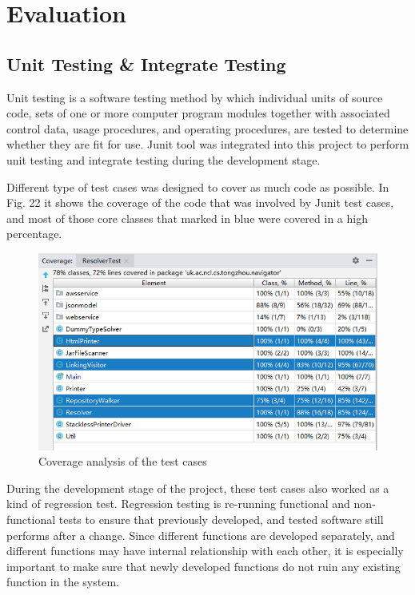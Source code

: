 \documentclass[runningheads]{llncs}
\begin{document}
\section{Evaluation}

\subsection{Unit Testing \& Integrate Testing}

Unit testing is a software testing method by which individual units of source code, sets of one or more computer program modules together with associated control data, usage procedures, and operating procedures, are tested to determine whether they are fit for use.\cite{huizinga2007automated} Junit tool was integrated into this project to perform unit testing and integrate testing during the development stage.

Different type of test cases was designed to cover as much code as possible. In Fig. 22 it shows the coverage of the code that was involved by Junit test cases, and most of those core classes that marked in blue were covered in a high percentage.

\begin{figure}[H]
	\centering
	\includegraphics[width=12cm]{pic/unit-test-coverage.png}
	\caption{Coverage analysis of the test cases}
	\label{Coverage analysis of the test cases}
\end{figure}

During the development stage of the project, these test cases also worked as a kind of regression test. Regression testing is re-running functional and non-functional tests to ensure that previously developed, and tested software still performs after a change.\cite{basu2015software} Since different functions are developed separately, and different functions may have internal relationship with each other, it is especially important to make sure that newly developed functions do not ruin any existing function in the system.
\end{document}
